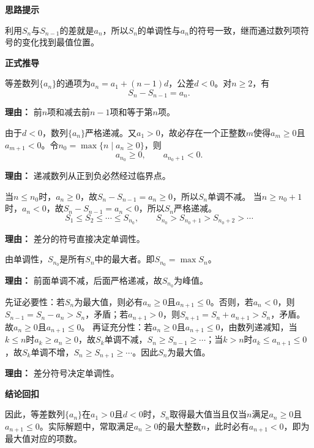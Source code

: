 \begin{proofbox}

	\textbf{\textcolor{CProof}{思路提示}}

	利用$S_n$与$S_{n-1}$的差就是$a_n$，所以$S_n$的单调性与$a_n$的符号一致，继而通过数列项符号的变化找到最值位置。

	\medskip
	\textbf{\textcolor{CProof}{正式推导}}
	\begin{description}[style=nextline, leftmargin=2.8em, labelsep=0.5em, itemsep=0.55em]
		\item[\textbf{步骤一（通项与差分）：}]
			等差数列$\{a_n\}$的通项为$a_n = a_1+(n-1)d$，公差$d<0$。对$n\ge 2$，有
			\[
				S_n - S_{n-1} = a_n.
			\]
			\par\textbf{理由：}
			前$n$项和减去前$n-1$项和等于第$n$项。

		\item[\textbf{步骤二（符号分析）：}]
			由于$d<0$，数列$\{a_n\}$严格递减。又$a_1>0$，故必存在一个正整数$m$使得$a_m\ge 0$且$a_{m+1}<0$。令$n_0 = \max\{n\mid a_n\ge 0\}$，则
			\[
				a_{n_0}\ge 0,
				\qquad
				a_{n_0+1}<0.
			\]
			\par\textbf{理由：}
			递减数列从正到负必然经过临界点。

		\item[\textbf{步骤三（单调性分段）：}]
			当$n\le n_0$时，$a_n\ge 0$，故$S_n - S_{n-1}=a_n\ge 0$，所以$S_n$单调不减。
			当$n\ge n_0+1$时，$a_n<0$，故$S_n - S_{n-1}=a_n<0$，所以$S_n$严格递减。
			\[
				S_1\le S_2\le\cdots\le S_{n_0},
				\qquad
				S_{n_0}>S_{n_0+1}>S_{n_0+2}>\cdots
			\]
			\par\textbf{理由：}
			差分的符号直接决定单调性。

		\item[\textbf{步骤四（最大值确定）：}]
			由单调性，$S_{n_0}$是所有$S_n$中的最大者。即$S_{n_0} = \max S_n$。
			\par\textbf{理由：}
			前面单调不减，后面严格递减，故$S_{n_0}$为峰值。

		\item[\textbf{步骤五（充要条件证明）：}]
			先证必要性：若$S_n$为最大值，则必有$a_n\ge 0$且$a_{n+1}\le 0$。否则，若$a_n<0$，则$S_{n-1}=S_n-a_n>S_n$，矛盾；若$a_{n+1}>0$，则$S_{n+1}=S_n+a_{n+1}>S_n$，矛盾。故$a_n\ge0$且$a_{n+1}\le0$。
			再证充分性：若$a_n\ge0$且$a_{n+1}\le0$，由数列递减知，当$k\le n$时$a_k\ge a_n\ge0$，故$S_k$单调不减，$S_n\ge S_{n-1}\ge\cdots$；当$k>n$时$a_k\le a_{n+1}\le0$，故$S_k$单调不增，$S_n\ge S_{n+1}\ge\cdots$。因此$S_n$为最大值。
			\par\textbf{理由：} 差分符号决定单调性。
	\end{description}

	\medskip
	\textbf{\textcolor{CProof}{结论回扣}}

	因此，等差数列$\{a_n\}$在$a_1>0$且$d<0$时，$S_n$取得最大值当且仅当$n$满足$a_n\ge 0$且$a_{n+1}\le 0$。实际解题中，常取满足$a_n\ge 0$的最大整数$n$，此时必有$a_{n+1}<0$，即为最大值对应的项数。

\end{proofbox}
